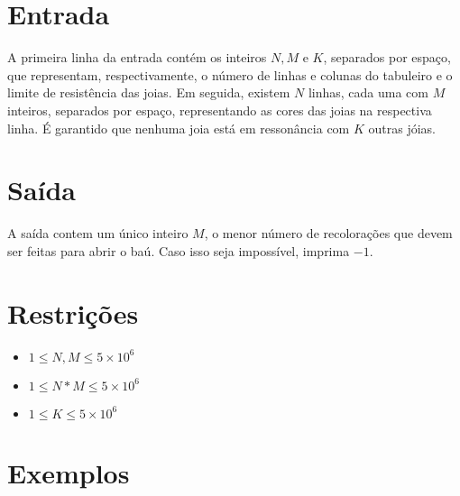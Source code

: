 \section*{Entrada}

A primeira linha da entrada contém os inteiros $N, M$ e $K$, separados por espaço, que representam, respectivamente, o número de linhas e colunas do tabuleiro e o limite de resistência das joias.
Em seguida, existem $N$ linhas, cada uma com $M$ inteiros, separados por espaço, representando as cores das joias na respectiva linha.
É garantido que nenhuma joia está em ressonância com $K$ outras jóias.

\section*{Saída}

A saída contem um único inteiro $M$, o menor número de recolorações que devem ser feitas para abrir o baú.
Caso isso seja impossível, imprima $-1$.

\section*{Restrições}

\begin{itemize}
\item $1 \leq N, M \leq 5 \times 10^6$
\item $1 \leq N*M \leq 5 \times 10^6$
\item $1 \leq K \leq 5 \times 10^6$
\end{itemize}


\section*{Exemplos}

\exemplo
